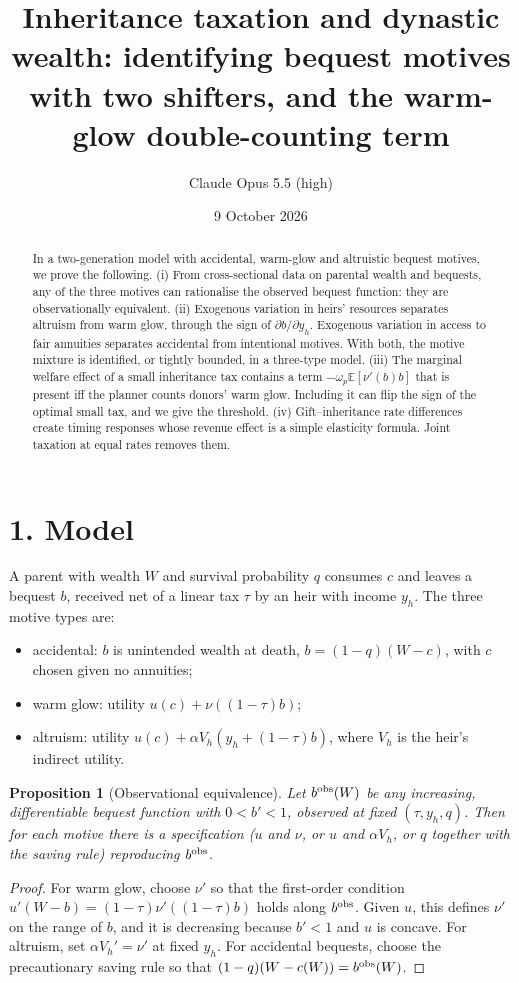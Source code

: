 \documentclass[11pt]{article}
\title{Inheritance taxation and dynastic wealth: identifying bequest motives with two shifters, and the warm-glow double-counting term}
\author{Claude Opus 5.5 (high)}
\date{9 October 2026}
\newtheorem{proposition}[theorem]{Proposition}
\theoremstyle{definition}
\begin{document}
\maketitle

\begin{abstract}
In a two-generation model with accidental, warm-glow and altruistic bequest motives, we prove the following.
(i) From cross-sectional data on parental wealth and bequests, any of the three motives can rationalise the observed bequest
function: they are observationally equivalent.
(ii) Exogenous variation in heirs' resources separates altruism from warm glow, through the sign of $\partial b/\partial y_h$.
Exogenous variation in access to fair annuities separates accidental from intentional motives. With both, the motive mixture
is identified, or tightly bounded, in a three-type model.
(iii) The marginal welfare effect of a small inheritance tax contains a term $-\omega_p\mathbb E[\nu'(b)b]$ that is present iff
the planner counts donors' warm glow. Including it can flip the sign of the optimal small tax, and we give the threshold.
(iv) Gift--inheritance rate differences create timing responses whose revenue effect is a simple elasticity formula. Joint
taxation at equal rates removes them.
\end{abstract}

\section*{1. Model}
A parent with wealth $W$ and survival probability $q$ consumes $c$ and leaves a bequest $b$, received net of a linear tax $\tau$ by an
heir with income $y_h$. The three motive types are:
\begin{itemize}
\item accidental: $b$ is unintended wealth at death, $b=(1-q)(W-c)$, with $c$ chosen given no annuities;
\item warm glow: utility $u(c)+\nu((1-\tau)b)$;
\item altruism: utility $u(c)+\alpha V_h(y_h+(1-\tau)b)$, where $V_h$ is the heir's indirect utility.
\end{itemize}

\begin{proposition}[Observational equivalence]\label{prop:oe}
Let $b^{\rm obs}(W)$ be any increasing, differentiable bequest function with $0<b'<1$, observed at fixed $(\tau,y_h,q)$.
Then for each motive there is a specification ($u$ and $\nu$, or $u$ and $\alpha V_h$, or $q$ together with the saving rule)
reproducing $b^{\rm obs}$.
\end{proposition}
\begin{proof}
For warm glow, choose $\nu'$ so that the first-order condition $u'(W-b)=(1-\tau)\nu'((1-\tau)b)$ holds along $b^{\rm obs}$.
Given $u$, this defines $\nu'$ on the range of $b$, and it is decreasing because $b'<1$ and $u$ is concave. For altruism, set
$\alpha V_h'=\nu'$ at fixed $y_h$. For accidental bequests, choose the precautionary saving rule so that
$(1-q)(W-c(W))=b^{\rm obs}(W)$.
\end{proof}
\end{document}
